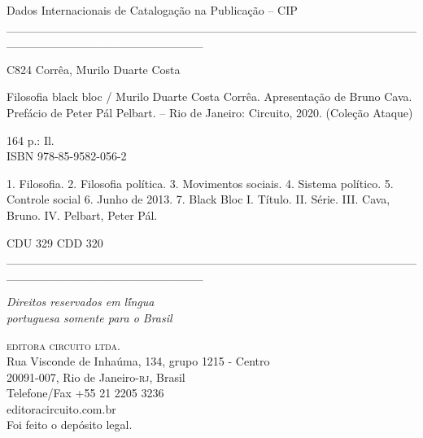 {%
\begin{flushleft}
\hspace{10pt}Dados Internacionais de Catalogação na Publicação -- CIP
\_\_\_\_\_\_\_\_\_\_\_\_\_\_\_\_\_\_\_\_\_\_\_\_\_\_\_\_\_\_\_\_\_\_\_\_\_\_\_\_\_\_\_\_\_\_\_\_\_\_\_\_\_\_\_\_\_\_\_\_\_\_\_\_\_\_\_\_\_\_\_
\end{flushleft}
C824 \hspace{5pt}Corrêa, Murilo Duarte Costa\\
\hspace{20pt}\parbox{185pt}{Filosofia black bloc / Murilo Duarte Costa Corrêa. Apresentação de Bruno Cava. Prefácio de Peter Pál Pelbart. -- Rio de Janeiro: Circuito, 2020. (Coleção Ataque)}

\hspace{20pt}164 p.: Il.\\[6pt]

\hspace{20pt}ISBN 978-85-9582-056-2\\[6pt]

\hspace{20pt}\parbox{185pt}{1. Filosofia. 2. Filosofia política. 3. Movimentos sociais. 4. Sistema político. 5. Controle social 6. Junho de 2013. 7. Black Bloc I. Título. II. Série. III. Cava, Bruno. IV. Pelbart, Peter Pál.}

\begin{flushleft}
\hspace{20pt}CDU 329 \hspace{138pt}CDD 320
\_\_\_\_\_\_\_\_\_\_\_\_\_\_\_\_\_\_\_\_\_\_\_\_\_\_\_\_\_\_\_\_\_\_\_\_\_\_\_\_\_\_\_\_\_\_\_\_\_\_\_\_\_\_\_\_\_\_\_\_\_\_\_\_\_\_\_\_\_\_\_\\
\end{flushleft}

\vfill\textit{Direitos reservados em l\'íngua\\ portuguesa somente para o Brasil}\\\medskip

%
\textsc{editora circuito ltda.}\\ 
Rua Visconde de Inhaúma, 134, grupo 1215 - Centro\\
20091-007, Rio de Janeiro-\textsc{rj}, Brasil\\
Telefone/Fax +55 21 2205 3236\\\smallskip
editoracircuito.com.br\\
\bigskip
Foi feito o depósito legal.\\\endgroup
\pagebreak\raggedleft
\titulagem

}
